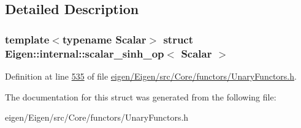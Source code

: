 \subsection{Detailed Description}
\subsubsection*{template$<$typename Scalar$>$\newline
struct Eigen\+::internal\+::scalar\+\_\+sinh\+\_\+op$<$ Scalar $>$}



Definition at line \hyperlink{eigen_2_eigen_2src_2_core_2functors_2_unary_functors_8h_source_l00535}{535} of file \hyperlink{eigen_2_eigen_2src_2_core_2functors_2_unary_functors_8h_source}{eigen/\+Eigen/src/\+Core/functors/\+Unary\+Functors.\+h}.



The documentation for this struct was generated from the following file\+:\begin{DoxyCompactItemize}
\item 
eigen/\+Eigen/src/\+Core/functors/\+Unary\+Functors.\+h\end{DoxyCompactItemize}
